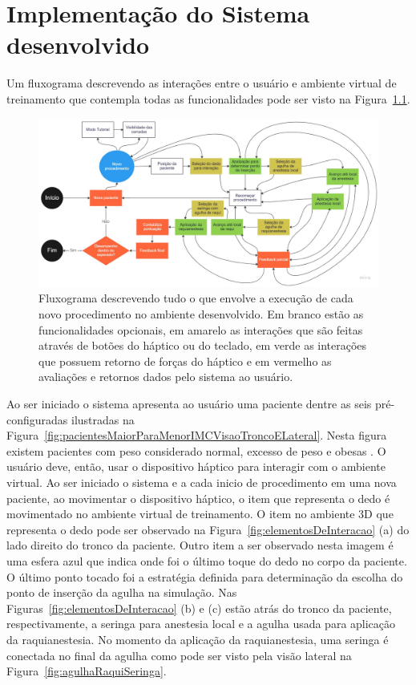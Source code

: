 \chapter{Implementação do Sistema desenvolvido} \label{cap:cap5}

Um fluxograma descrevendo as interações entre o usuário e ambiente virtual de treinamento que contempla todas as funcionalidades pode ser visto na 
Figura~\ref{fig:fluxogramaAmbiente}.

\begin{figure}[ht!]
    \centering
    \includegraphics[width=0.98\linewidth]{capitulos/figuras/fluxograma-ambiente-desenvolvido.jpg} 
    \caption{Fluxograma descrevendo tudo o que envolve a execução de cada novo procedimento no ambiente desenvolvido. Em branco estão as funcionalidades opcionais, em amarelo as interações que são feitas através de botões do háptico ou do teclado, em verde as interações que possuem retorno de forças do háptico e em vermelho as avaliações e retornos dados pelo sistema ao usuário.}
    \label{fig:fluxogramaAmbiente}
\end{figure}

Ao ser iniciado o sistema apresenta ao usuário uma paciente dentre as seis pré-configuradas ilustradas na Figura~\ref{fig:pacientesMaiorParaMenorIMCVisaoTroncoELateral}. Nesta figura existem pacientes com peso considerado normal, excesso de peso e obesas \cite{MTILLC2019}. O usuário deve, então, usar o dispositivo háptico para interagir com o ambiente virtual. Ao ser iniciado o sistema e a cada inicio de procedimento em uma nova paciente, ao movimentar o dispositivo háptico, o item que representa o dedo é movimentado no ambiente virtual de treinamento. O item no ambiente 3D que representa o dedo pode ser observado na Figura~\ref{fig:elementosDeInteracao} (a) do lado direito do tronco da paciente. Outro item a ser observado nesta imagem é uma esfera azul que indica onde foi o último toque do dedo no corpo da paciente. O último ponto tocado foi a estratégia definida para determinação da escolha do ponto de inserção da agulha na simulação. Nas Figuras~\ref{fig:elementosDeInteracao} (b) e (c) estão atrás do tronco da paciente, respectivamente, a seringa para anestesia local e a agulha usada para aplicação da raquianestesia. No momento da aplicação da raquianestesia, uma seringa é conectada no final da agulha como pode ser visto pela visão lateral na Figura~\ref{fig:agulhaRaquiSeringa}.

